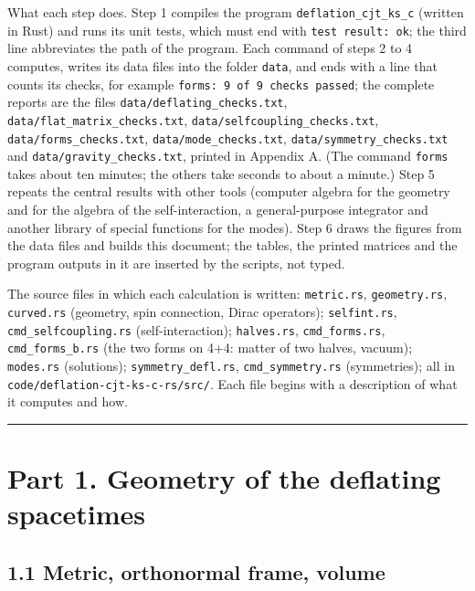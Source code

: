 \documentclass[
  10pt,
]{article}
\begin{document}
What each step does. Step 1 compiles the program
\texttt{deflation\_cjt\_ks\_c} (written in Rust) and runs its unit
tests, which must end with \texttt{test\ result:\ ok}; the third line
abbreviates the path of the program. Each command of steps 2 to 4
computes, writes its data files into the folder \texttt{data}, and ends
with a line that counts its checks, for example
\texttt{forms:\ 9\ of\ 9\ checks\ passed}; the complete reports are the
files \texttt{data/deflating\_checks.txt},
\texttt{data/flat\_matrix\_checks.txt},
\texttt{data/selfcoupling\_checks.txt}, \texttt{data/forms\_checks.txt},
\texttt{data/mode\_checks.txt}, \texttt{data/symmetry\_checks.txt} and
\texttt{data/gravity\_checks.txt}, printed in Appendix A. (The command
\texttt{forms} takes about ten minutes; the others take seconds to about
a minute.) Step 5 repeats the central results with other tools (computer
algebra for the geometry and for the algebra of the self-interaction, a
general-purpose integrator and another library of special functions for
the modes). Step 6 draws the figures from the data files and builds this
document; the tables, the printed matrices and the program outputs in it
are inserted by the scripts, not typed.

The source files in which each calculation is written:
\texttt{metric.rs}, \texttt{geometry.rs}, \texttt{curved.rs} (geometry,
spin connection, Dirac operators); \texttt{selfint.rs},
\texttt{cmd\_selfcoupling.rs} (self-interaction); \texttt{halves.rs},
\texttt{cmd\_forms.rs}, \texttt{cmd\_forms\_b.rs} (the two forms on 4+4:
matter of two halves, vacuum); \texttt{modes.rs} (solutions);
\texttt{symmetry\_defl.rs}, \texttt{cmd\_symmetry.rs} (symmetries); all
in \texttt{code/deflation-cjt-ks-c-rs/src/}. Each file begins with a
description of what it computes and how.

\begin{center}\rule{0.5\linewidth}{0.5pt}\end{center}

\hypertarget{part-1.-geometry-of-the-deflating-spacetimes}{%
\section{Part 1. Geometry of the deflating
spacetimes}\label{part-1.-geometry-of-the-deflating-spacetimes}}

\hypertarget{metric-orthonormal-frame-volume}{%
\subsection{1.1 Metric, orthonormal frame,
volume}\label{metric-orthonormal-frame-volume}}
\end{document}
